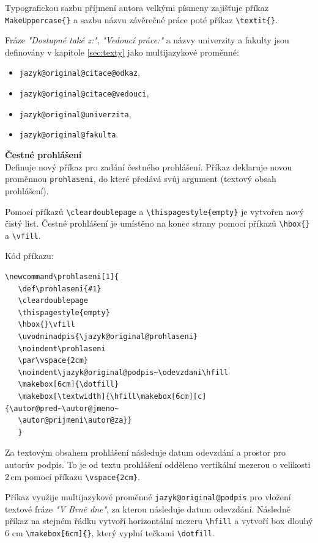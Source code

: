 Typografickou sazbu příjmení autora velkými písmeny zajišťuje příkaz \verb|MakeUppercase{}| a sazbu názvu závěrečné práce poté příkaz \verb|\textit{}|.

Fráze \textit{"Dostupné také z:"}, \textit{"Vedoucí práce:"} a názvy univerzity a fakulty jsou definovány v kapitole \ref{sec:texty} jako multijazykové proměnné:

\begin{itemize}[label=-]
	\item \verb|jazyk@original@citace@odkaz|,
	\item \verb|jazyk@original@citace@vedouci|,
	\item \verb|jazyk@original@univerzita|,
	\item \verb|jazyk@original@fakulta|.
\end{itemize}

\vspace{8pt}
\textbf{Čestné prohlášení}\\
Definuje nový příkaz pro zadání čestného prohlášení. Příkaz deklaruje novou proměnnou \verb|prohlaseni|, do které předává svůj argument (textový obsah prohlášení).

Pomocí příkazů \verb|\cleardoublepage| a \verb|\thispagestyle{empty}| je vytvořen nový čistý list. Čestné prohlášení je umístěno na konec strany pomocí příkazů \verb|\hbox{}| a \verb|\vfill|.

Kód příkazu:

\begin{verbatim}
\newcommand\prohlaseni[1]{
   \def\prohlaseni{#1}
   \cleardoublepage
   \thispagestyle{empty}
   \hbox{}\vfill
   \uvodninadpis{\jazyk@original@prohlaseni}
   \noindent\prohlaseni
   \par\vspace{2cm}
   \noindent\jazyk@original@podpis~\odevzdani\hfill
   \makebox[6cm]{\dotfill}
   \makebox[\textwidth]{\hfill\makebox[6cm][c]{\autor@pred~\autor@jmeno~
   \autor@prijmeni\autor@za}}
   }
\end{verbatim}

Za textovým obsahem prohlášení následuje datum odevzdání a prostor pro autorův podpis. To je od textu prohlášení odděleno vertikální mezerou o velikosti 2\,cm pomocí příkazu \verb|\vspace{2cm}|.

Příkaz využije multijazykové proměnné \verb|jazyk@original@podpis| pro vložení textové fráze \textit{"V Brně dne"}, za kterou následuje datum odevzdání. Následně příkaz na stejném řádku vytvoří horizontální mezeru \verb|\hfill| a vytvoří box dlouhý 6 cm \verb|\makebox[6cm]{}|, který vyplní tečkami \verb|\dotfill|.

